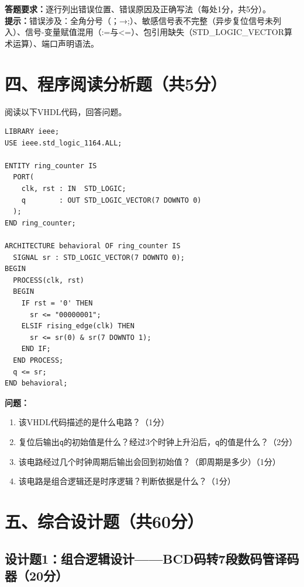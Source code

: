 \begin{framed}
\textbf{答题要求：}逐行列出错误位置、错误原因及正确写法（每处1分，共5分）。\\
\textbf{提示：}错误涉及：全角分号（；→;）、敏感信号表不完整（异步复位信号未列入）、信号-变量赋值混用（:=与<=）、包引用缺失（STD\_LOGIC\_VECTOR算术运算）、端口声明语法。
\end{framed}

\newpage

\section*{四、程序阅读分析题（共5分）}

阅读以下VHDL代码，回答问题。

\begin{lstlisting}[caption={分析用VHDL代码}]
LIBRARY ieee;
USE ieee.std_logic_1164.ALL;

ENTITY ring_counter IS
  PORT(
    clk, rst : IN  STD_LOGIC;
    q        : OUT STD_LOGIC_VECTOR(7 DOWNTO 0)
  );
END ring_counter;

ARCHITECTURE behavioral OF ring_counter IS
  SIGNAL sr : STD_LOGIC_VECTOR(7 DOWNTO 0);
BEGIN
  PROCESS(clk, rst)
  BEGIN
    IF rst = '0' THEN
      sr <= "00000001";
    ELSIF rising_edge(clk) THEN
      sr <= sr(0) & sr(7 DOWNTO 1);
    END IF;
  END PROCESS;
  q <= sr;
END behavioral;
\end{lstlisting}

\begin{framed}
\textbf{问题：}
\begin{enumerate}[label=(\arabic*)]
  \item 该VHDL代码描述的是什么电路？（1分）
  \item 复位后输出\texttt{q}的初始值是什么？经过3个时钟上升沿后，\texttt{q}的值是什么？（2分）
  \item 该电路经过几个时钟周期后输出会回到初始值？（即周期是多少）（1分）
  \item 该电路是组合逻辑还是时序逻辑？判断依据是什么？（1分）
\end{enumerate}
\end{framed}

\newpage

\section*{五、综合设计题（共60分）}

\subsection*{设计题1：组合逻辑设计——BCD码转7段数码管译码器（20分）}

